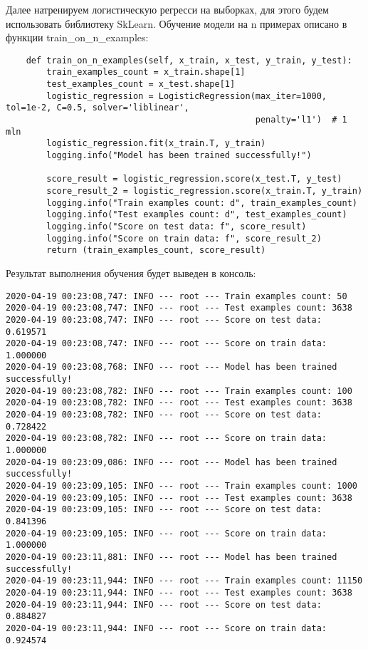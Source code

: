 Далее натренируем логистическую регресси на выборках, для этого будем использовать библиотеку SkLearn. Обучение модели на n примерах описано в функции train\_on\_n\_examples:

\begin{lstlisting}
    def train_on_n_examples(self, x_train, x_test, y_train, y_test):
        train_examples_count = x_train.shape[1]
        test_examples_count = x_test.shape[1]
        logistic_regression = LogisticRegression(max_iter=1000, tol=1e-2, C=0.5, solver='liblinear',
                                                 penalty='l1')  # 1 mln
        logistic_regression.fit(x_train.T, y_train)
        logging.info("Model has been trained successfully!")

        score_result = logistic_regression.score(x_test.T, y_test)
        score_result_2 = logistic_regression.score(x_train.T, y_train)
        logging.info("Train examples count: d", train_examples_count)
        logging.info("Test examples count: d", test_examples_count)
        logging.info("Score on test data: f", score_result)
        logging.info("Score on train data: f", score_result_2)
        return (train_examples_count, score_result)
\end{lstlisting}

Результат выполнения обучения будет выведен в консоль:

\begin{lstlisting}
2020-04-19 00:23:08,747: INFO --- root --- Train examples count: 50
2020-04-19 00:23:08,747: INFO --- root --- Test examples count: 3638
2020-04-19 00:23:08,747: INFO --- root --- Score on test data: 0.619571
2020-04-19 00:23:08,747: INFO --- root --- Score on train data: 1.000000
2020-04-19 00:23:08,768: INFO --- root --- Model has been trained successfully!
2020-04-19 00:23:08,782: INFO --- root --- Train examples count: 100
2020-04-19 00:23:08,782: INFO --- root --- Test examples count: 3638
2020-04-19 00:23:08,782: INFO --- root --- Score on test data: 0.728422
2020-04-19 00:23:08,782: INFO --- root --- Score on train data: 1.000000
2020-04-19 00:23:09,086: INFO --- root --- Model has been trained successfully!
2020-04-19 00:23:09,105: INFO --- root --- Train examples count: 1000
2020-04-19 00:23:09,105: INFO --- root --- Test examples count: 3638
2020-04-19 00:23:09,105: INFO --- root --- Score on test data: 0.841396
2020-04-19 00:23:09,105: INFO --- root --- Score on train data: 1.000000
2020-04-19 00:23:11,881: INFO --- root --- Model has been trained successfully!
2020-04-19 00:23:11,944: INFO --- root --- Train examples count: 11150
2020-04-19 00:23:11,944: INFO --- root --- Test examples count: 3638
2020-04-19 00:23:11,944: INFO --- root --- Score on test data: 0.884827
2020-04-19 00:23:11,944: INFO --- root --- Score on train data: 0.924574
\end{lstlisting}

